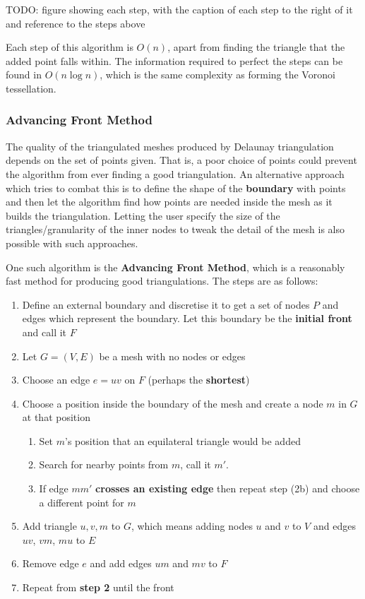 \documentclass{article}
\begin{document}
TODO: figure showing each step, with the caption of each step to the right of it and reference to the steps above

Each step of this algorithm is $O(n)$, apart from finding the triangle that the added point falls within. The information required to perfect the steps can be found in $O(n\log n)$, which is the same complexity as forming the Voronoi tessellation.

\subsubsection{Advancing Front Method}

The quality of the triangulated meshes produced by Delaunay triangulation depends on the set of points given. That is, a poor choice of points could prevent the algorithm from ever finding a good triangulation. An alternative approach which tries to combat this is to define the shape of the \textbf{boundary} with points and then let the algorithm find how points are needed inside the mesh as it builds the triangulation. Letting the user specify the size of the triangles/granularity of the inner nodes to tweak the detail of the mesh is also possible with such approaches.

One such algorithm is the \textbf{Advancing Front Method}, which is a reasonably fast method for producing good triangulations. The steps are as follows:
\begin{enumerate}
	\item Define an external boundary and discretise it to get a set of nodes $P$ and edges which represent the boundary. Let this boundary be the \textbf{initial front} and call it $F$
	\item Let $G = (V, E)$ be a mesh with no nodes or edges
	\item Choose an edge $e = uv$ on $F$ (perhaps the \textbf{shortest})
	\item Choose a position inside the boundary of the mesh and create a node $m$ in $G$ at that position
	\begin{enumerate}
		\item Set $m$'s position that an equilateral triangle would be added
		\item Search for nearby points from $m$, call it $m'$.
		\item If edge $mm'$ \textbf{crosses an existing edge} then repeat step (2b) and choose a different point for $m$
	\end{enumerate}
	\item Add triangle $u,v,m$ to $G$, which means adding nodes $u$ and $v$ to $V$ and edges $uv$, $vm$, $mu$ to $E$
	\item Remove edge $e$ and add edges $um$ and $mv$ to $F$
	\item Repeat from \textbf{step 2} until the front 
\end{enumerate}
\end{document}

